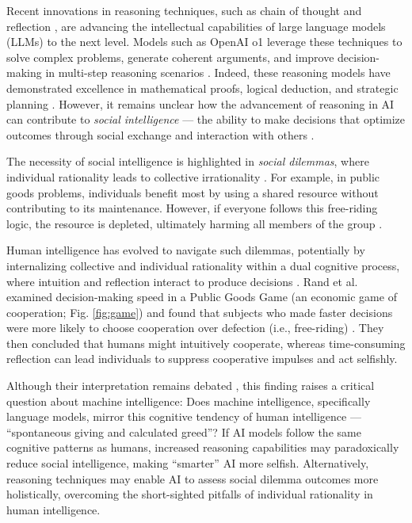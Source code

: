 Recent innovations in reasoning techniques, such as chain of thought \cite{wei2022chain} and reflection \cite{shinn2023reflexion}, are advancing the intellectual capabilities of large language models (LLMs) to the next level.
Models such as OpenAI o1 leverage these techniques to solve complex problems, generate coherent arguments, and improve decision-making in multi-step reasoning scenarios \cite{jaech2024openai, guo2025deepseek, snell2024scaling}. 
Indeed, these reasoning models have demonstrated excellence in mathematical proofs, logical deduction, and strategic planning \cite{trinh2024solving, muennighoff2025s1}. 
However, it remains unclear how the advancement of reasoning in AI can contribute to \textit{social intelligence} --- the ability to make decisions that optimize outcomes through social exchange and interaction with others \cite{kihlstrom2000social, jiang2025investigating, hagendorff2023human, schramowski2022large}.

The necessity of social intelligence is highlighted in \textit{social dilemmas}, where individual rationality leads to collective irrationality \cite{kollock1998social}.
For example, in public goods problems, individuals benefit most by using a shared resource without contributing to its maintenance. 
However, if everyone follows this free-riding logic, the resource is depleted, ultimately harming all members of the group \cite{hardin1968tragedy, dawes1980social}. 

Human intelligence has evolved to navigate such dilemmas, potentially by internalizing collective and individual rationality within a dual cognitive process, where intuition and reflection interact to produce decisions \cite{kahneman2011thinking}. 
Rand et al. examined decision-making speed in a Public Goods Game (an economic game of cooperation; Fig. \ref{fig:game}) and found that subjects who made faster decisions were more likely to choose cooperation over defection (i.e., free-riding) \cite{rand2012spontaneous}. 
They then concluded that humans might intuitively cooperate, whereas time-consuming reflection can lead individuals to suppress cooperative impulses and act selfishly.

Although their interpretation remains debated \cite{rand2016cooperation, capraro2016rethinking}, this finding raises a critical question about machine intelligence: Does machine intelligence, specifically language models, mirror this cognitive tendency of human intelligence  --- “spontaneous giving and calculated greed”?  
If AI models follow the same cognitive patterns as humans, increased reasoning capabilities may paradoxically reduce social intelligence, making “smarter” AI more selfish. 
Alternatively, reasoning techniques may enable AI to assess social dilemma outcomes more holistically, overcoming the short-sighted pitfalls of individual rationality in human intelligence. 

